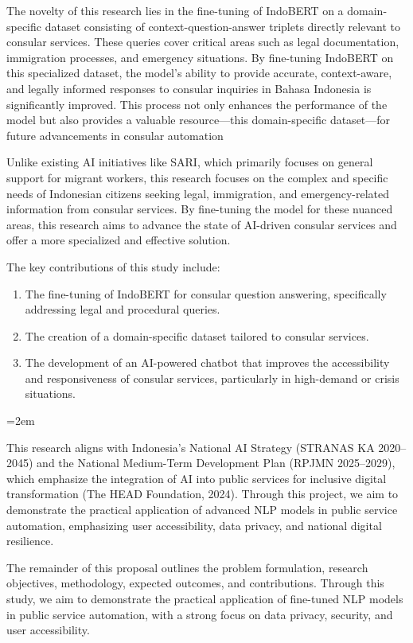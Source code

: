 \documentclass[a4paper,12pt]{report}
\begin{document}
The novelty of this research lies in the fine-tuning of IndoBERT on a domain-specific dataset consisting of context-question-answer triplets directly relevant to consular services. These queries cover critical areas such as legal documentation, immigration processes, and emergency situations. By fine-tuning IndoBERT on this specialized dataset, the model's ability to provide accurate, context-aware, and legally informed responses to consular inquiries in Bahasa Indonesia is significantly improved. This process not only enhances the performance of the model but also provides a valuable resource—this domain-specific dataset—for future advancements in consular automation

Unlike existing AI initiatives like SARI, which primarily focuses on general support for migrant workers, this research focuses on the complex and specific needs of Indonesian citizens seeking legal, immigration, and emergency-related information from consular services. By fine-tuning the model for these nuanced areas, this research aims to advance the state of AI-driven consular services and offer a more specialized and effective solution.

The key contributions of this study include:
\begin{enumerate}
    \item The fine-tuning of IndoBERT for consular question answering, specifically addressing legal and procedural queries.
    \item The creation of a domain-specific dataset tailored to consular services.
    \item The development of an AI-powered chatbot that improves the accessibility and responsiveness of consular services, particularly in high-demand or crisis situations.
\end{enumerate}

\emergencystretch=2em
\begin{sloppypar}
  This research aligns with Indonesia’s National AI Strategy (STRANAS KA 2020–2045) and the National Medium-Term Development Plan (RPJMN 2025–2029), which emphasize the integration of AI into public services for inclusive digital transformation (The HEAD Foundation, 2024). Through this project, we aim to demonstrate the practical application of advanced NLP models in public service automation, emphasizing user accessibility, data privacy, and national digital resilience.
\end{sloppypar}

The remainder of this proposal outlines the problem formulation, research objectives, methodology, expected outcomes, and contributions. Through this study, we aim to demonstrate the practical application of fine-tuned NLP models in public service automation, with a strong focus on data privacy, security, and user accessibility.
\end{document}
